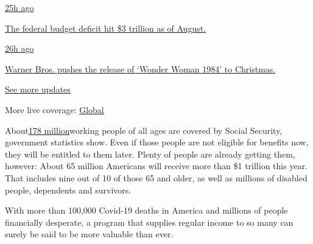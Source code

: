 \href{https://www.nytimes3xbfgragh.onion/live/2020/09/11/business/stock-market-today-coronavirus?action=click\&pgtype=Article\&state=default\&region=MAIN_CONTENT_1\&context=storylines_live_updates\#the-federal-budget-deficit-hit-3-trillion-as-of-august}{25h
ago}

\href{https://www.nytimes3xbfgragh.onion/live/2020/09/11/business/stock-market-today-coronavirus?action=click\&pgtype=Article\&state=default\&region=MAIN_CONTENT_1\&context=storylines_live_updates\#the-federal-budget-deficit-hit-3-trillion-as-of-august}{The
federal budget deficit hit \$3 trillion as of August.}

\href{https://www.nytimes3xbfgragh.onion/live/2020/09/11/business/stock-market-today-coronavirus?action=click\&pgtype=Article\&state=default\&region=MAIN_CONTENT_1\&context=storylines_live_updates\#warner-bros-pushes-the-release-of-wonder-woman-1984-to-christmas}{26h
ago}

\href{https://www.nytimes3xbfgragh.onion/live/2020/09/11/business/stock-market-today-coronavirus?action=click\&pgtype=Article\&state=default\&region=MAIN_CONTENT_1\&context=storylines_live_updates\#warner-bros-pushes-the-release-of-wonder-woman-1984-to-christmas}{Warner
Bros. pushes the release of `Wonder Woman 1984' to Christmas.}

\href{https://www.nytimes3xbfgragh.onion/live/2020/09/11/business/stock-market-today-coronavirus?action=click\&pgtype=Article\&state=default\&region=MAIN_CONTENT_1\&context=storylines_live_updates}{See
more updates}

More live coverage:
\href{https://www.nytimes3xbfgragh.onion/2020/09/11/world/covid-19-coronavirus.html?action=click\&pgtype=Article\&state=default\&region=MAIN_CONTENT_1\&context=storylines_live_updates}{Global}

About\href{https://www.ssa.gov/news/press/factsheets/basicfact-alt.pdf}{178
million}working people of all ages are covered by Social Security,
government statistics show. Even if those people are not eligible for
benefits now, they will be entitled to them later. Plenty of people are
already getting them, however: About 65 million Americans will receive
more than \$1 trillion this year. That includes nine out of 10 of those
65 and older, as well as millions of disabled people, dependents and
survivors.

With more than 100,000 Covid-19 deaths in America and millions of people
financially desperate, a program that supplies regular income to so many
can surely be said to be more valuable than ever.

